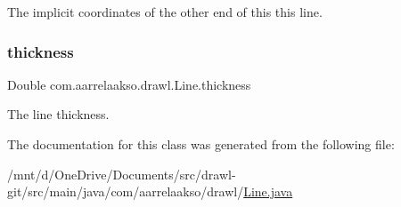 The implicit coordinates of the other end of this this line. 

\mbox{\label{classcom_1_1aarrelaakso_1_1drawl_1_1_line_a314ae0371f5665cf70ad99742d44934a}} 
\subsubsection{\texorpdfstring{thickness}{thickness}}
{\footnotesize\ttfamily Double com.\+aarrelaakso.\+drawl.\+Line.\+thickness\hspace{0.3cm}{\ttfamily [private]}}



The line thickness. 



The documentation for this class was generated from the following file\+:\begin{DoxyCompactItemize}
\item 
/mnt/d/\+One\+Drive/\+Documents/src/drawl-\/git/src/main/java/com/aarrelaakso/drawl/\hyperlink{_line_8java}{Line.\+java}\end{DoxyCompactItemize}
